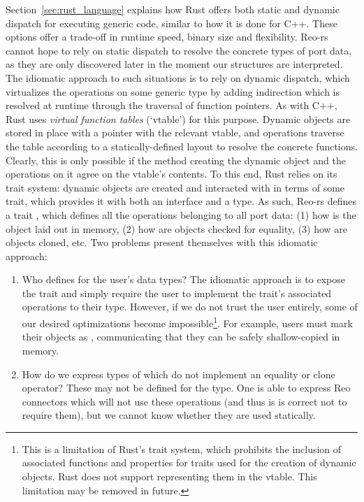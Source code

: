 Section~\ref{sec:rust_language} explains how Rust offers both static and dynamic dispatch for executing generic code, similar to how it is done for C++. These options offer a trade-off in runtime speed, binary size and flexibility. Reo-rs cannot hope to rely on static dispatch to resolve the concrete types of port data, as they are only discovered later in the moment our  structures are interpreted. The idiomatic approach to such situations is to rely on dynamic dispatch, which virtualizes the operations on some generic type by adding indirection which is resolved at runtime through the traversal of function pointers. As with C++, Rust uses \textit{virtual function tables} (`vtable') for this purpose. Dynamic objects are stored in place with a pointer with the relevant vtable, and operations traverse the table according to a statically-defined layout to resolve the concrete functions. Clearly, this is only possible if the method creating the dynamic object and the operations on it agree on the vtable's contents. To this end, Rust relies on its trait system: dynamic objects are created and interacted with in terms of some trait, which provides it with both an interface and a type. As such, Reo-rs defines a trait , which defines all the operations belonging to all port data: (1) how is the object laid out in memory, (2) how are objects checked for equality, (3) how are objects cloned, etc. Two problems present themselves with this idiomatic approach:
\begin{enumerate}
	\item Who defines  for the user's data types? The idiomatic approach is to expose the trait and simply require the user to implement the trait's associated operations to their type. However, if we do not trust the user entirely, some of our desired optimizations become impossible\footnote{This is a limitation of Rust's trait system, which prohibits the inclusion of associated functions and properties for traits used for the creation of dynamic objects. Rust does not support representing them in the vtable. This limitation may be removed in future.}. For example, users must mark their objects as , communicating that they can be safely shallow-copied in memory. 
	
	\item How do we express types of  which do not implement an equality or clone operator? These may not be defined for the type. One is able to express Reo connectors which will not use these operations (and thus is is correct not to require them), but we cannot know whether they are used statically.
\end{enumerate}

